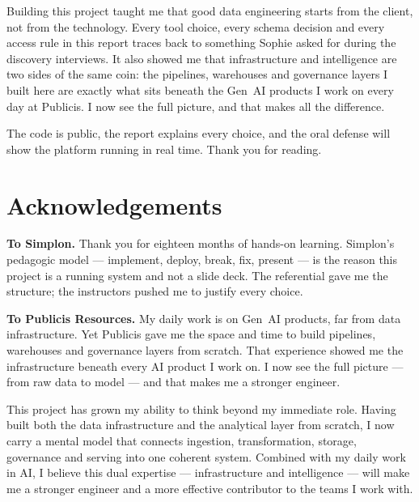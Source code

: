 \documentclass[a4paper,11pt,oneside,openany]{report}
\begin{document}
Building this project taught me that good data engineering starts from
the client, not from the technology. Every tool choice, every schema
decision and every access rule in this report traces back to something
Sophie asked for during the discovery interviews. It also showed me
that infrastructure and intelligence are two sides of the same coin:
the pipelines, warehouses and governance layers I built here are
exactly what sits beneath the Gen~AI products I work on every day at
Publicis. I now see the full picture, and that makes all the
difference.

The code is public, the report explains every choice, and the oral
defense will show the platform running in real time. Thank you for
reading.


\chapter*{Acknowledgements}

\noindent\textbf{To Simplon.} Thank you for eighteen months of
hands-on learning. Simplon's pedagogic model --- implement, deploy,
break, fix, present --- is the reason this project is a running
system and not a slide deck. The referential gave me the structure;
the instructors pushed me to justify every choice.

\vspace{0.4cm}

\noindent\textbf{To Publicis Resources.} My daily work is on Gen~AI
products, far from data infrastructure. Yet Publicis gave me the
space and time to build pipelines, warehouses and governance layers
from scratch. That experience showed me the infrastructure beneath
every AI product I work on. I now see the full picture --- from
raw data to model --- and that makes me a stronger engineer.

\vspace{0.4cm}

\noindent This project has grown my ability to think beyond my
immediate role. Having built both the data infrastructure and the
analytical layer from scratch, I now carry a mental model that
connects ingestion, transformation, storage, governance and
serving into one coherent system. Combined with my daily work in
AI, I believe this dual expertise --- infrastructure and
intelligence --- will make me a stronger engineer and a more
effective contributor to the teams I work with.
\end{document}
